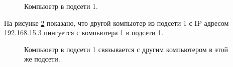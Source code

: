 \documentclass[a4paper,14pt]{article}
\begin{document}
\newpage
\begin{figure}[!h]
    \caption{Компьюетр в подсети 1.}
    \label{fig:pc11}
\end{figure}

\newpage
На рисунке \ref{fig:pc11ping} показано, что другой компьютер из подсети 1 с IP адресом 192.168.15.3 пингуется с компьютера 1 в подсети 1.

\begin{figure}[!h]
     \caption{Компьюетр в подсети 1 связывается с другим компьютером в этой же подсети.}
     \label{fig:pc11ping}
 \end{figure}
\end{document}
